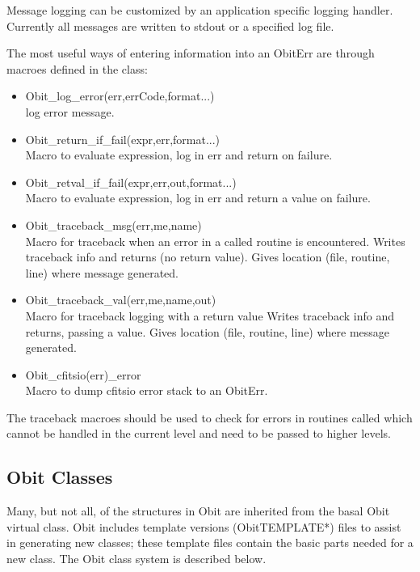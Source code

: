 \documentclass[11pt]{article}
\begin{document}
Message logging can be customized by an application specific logging
handler.
Currently all messages are written to stdout or a specified log file.

The most useful ways of entering information into an ObitErr are
through macroes defined in the class:
\begin{itemize}
\item Obit\_log\_error(err,errCode,format...)\\
log error message.
\item Obit\_return\_if\_fail(expr,err,format...) \\
Macro to evaluate expression, log in err and return on failure.
\item Obit\_retval\_if\_fail(expr,err,out,format...) \\
Macro to evaluate expression, log in err and return a value 
on failure.
\item Obit\_traceback\_msg(err,me,name)\\
Macro for traceback when an error in a called routine is encountered.
Writes traceback info and returns (no return value).
Gives location (file, routine, line) where message generated.
\item Obit\_traceback\_val(err,me,name,out)\\
Macro for traceback logging with a return value
Writes traceback info and returns, passing a value.
Gives location (file, routine, line) where message generated.
\item  Obit\_cfitsio(err)\_error\\
Macro to dump cfitsio error stack to an ObitErr.
\end{itemize}
The traceback macroes should be used to check for errors in routines
called which cannot be handled in the current level and need to be
passed to higher levels.

\subsection{Obit Classes}
Many, but not all, of the structures in Obit are inherited from the
basal Obit virtual class.
Obit includes template versions (ObitTEMPLATE*) files to assist in
generating new classes; these template files contain the basic parts
needed for a new class.
The Obit class system is described below.
\end{document}
